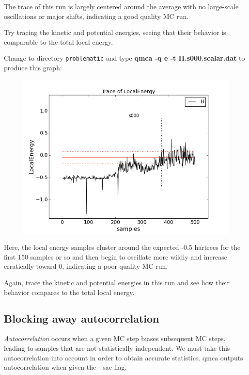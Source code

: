 The trace of this run is largely centered around the average with no
large-scale oscillations or major shifts, indicating a good quality MC run. 

Try tracing the kinetic and potential energies, seeing that their behavior is
comparable to the total local energy.

Change to directory \texttt{problematic} and type \textbf{qmca -q e -t
H.s000.scalar.dat} to produce this graph:

\FloatBarrier
\begin{figure}[ht!]
\begin{center}
\includegraphics[trim = 0mm 0mm 0mm 0mm, clip,width=0.75\columnwidth]{figures/lab_qmc_statistics_tracing2.png}
\end{center}
\end{figure}
\FloatBarrier


Here, the local energy samples cluster around the expected -0.5 hartrees for the
first 150 samples or so and then begin to oscillate more wildly and increase
erratically toward 0, indicating a poor quality MC run.

Again, trace the kinetic and potential energies in this run and see how their
behavior compares to the total local energy.

\subsection{Blocking away autocorrelation}

\textit{Autocorrelation} occurs when a given MC step biases subsequent MC
steps, leading to samples that are not statistically independent.  We must take
this autocorrelation into account in order to obtain accurate statistics.  qmca
outputs autocorrelation when given the {-}{-}sac flag.

